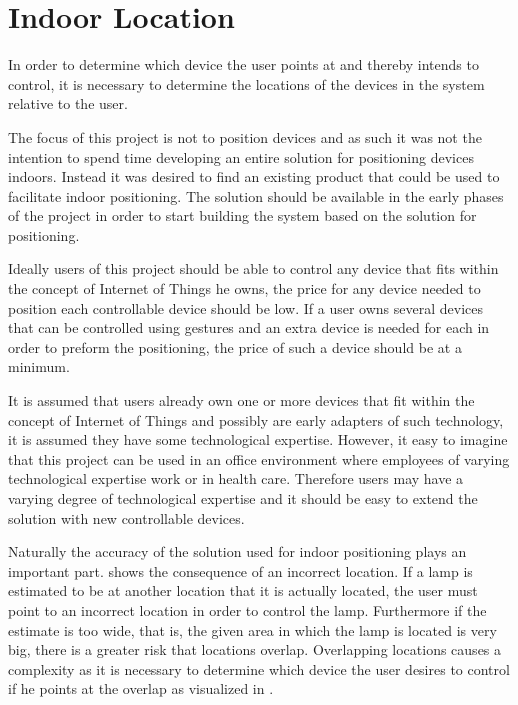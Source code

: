 \section{Indoor Location}\label{sec:designindoorlocation}
In order to determine which device the user points at and thereby intends to control, 
it is necessary to determine the locations of the devices in the system relative to the user.

The focus of this project is not to position devices and as such it was not the intention to spend time developing an entire solution for positioning devices indoors. 
Instead it was desired to find an existing product that could be used to facilitate indoor positioning.
The solution should be available in the early phases of the project in order to start building the system based on the solution for positioning.

Ideally users of this project should be able to control any device that fits within the concept of Internet of Things he owns, 
the price for any device needed to position each controllable device should be low. 
If a user owns several devices that can be controlled using gestures and an extra device is needed for each in order to preform the positioning, 
the price of such a device should be at a minimum.

It is assumed that users already own one or more devices that fit within the concept of Internet of Things and possibly are early adapters of such technology, 
it is assumed they have some technological expertise. 
However, it easy to imagine that this project can be used in an office environment where employees of varying technological expertise work or in health care. 
Therefore users may have a varying degree of technological expertise and it should be easy to extend the solution with new controllable devices.

Naturally the accuracy of the solution used for indoor positioning plays an important part. 
 shows the consequence of an incorrect location. 
If a lamp is estimated to be at another location that it is actually located, 
the user must point to an incorrect location in order to control the lamp.
Furthermore if the estimate is too wide, that is, the given area in which the lamp is located is very big, 
there is a greater risk that locations overlap. 
Overlapping locations causes a complexity as it is necessary to determine which device the user desires to control if he points at the overlap as visualized in .

